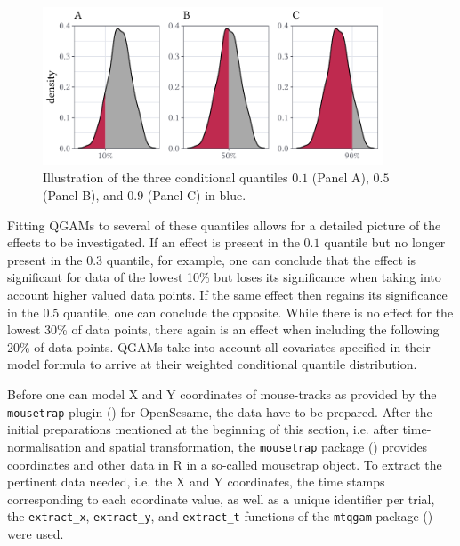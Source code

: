 \begin{figure}
    \centering
    \includegraphics[width=0.9\textwidth]{figures/fig7.9.pdf}
    \caption{Illustration of the three conditional quantiles $0.1$ (Panel A), $0.5$ (Panel B), and $0.9$ (Panel C) in blue.}
    \label{fig:7_9}
\end{figure}

Fitting QGAMs to several of these quantiles allows for a detailed picture of the effects to be investigated. If an effect is present in the $0.1$ quantile but no longer present in the $0.3$ quantile, for example, one can conclude that the effect is significant for data of the lowest 10\% but loses its significance when taking into account higher valued data points. If the same effect then regains its significance in the $0.5$ quantile, one can conclude the opposite. While there is no effect for the lowest 30\% of data points, there again is an effect when including the following 20\% of data points. QGAMs take into account all covariates specified in their model formula to arrive at their weighted conditional quantile distribution. 

Before one can model X and Y coordinates of mouse-tracks as provided by the \texttt{mousetrap} plugin (\cite{Kieslich2017}) for OpenSesame, the data have to be prepared. After the initial preparations mentioned at the beginning of this section, i.e. after time-normalisation and spatial transformation, the \texttt{mousetrap} package (\cite{Kieslich2019}) provides coordinates and other data in R in a so-called mousetrap object. To extract the pertinent data needed, i.e. the X and Y coordinates, the time stamps corresponding to each coordinate value, as well as a unique identifier per trial, the \texttt{extract\_x}, \texttt{extract\_y}, and \texttt{extract\_t} functions of the \texttt{mtqgam} package (\cite{Schmitz2021mtqgam}) were used. 

